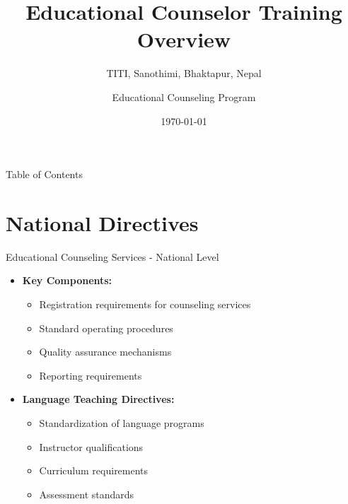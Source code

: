 \documentclass{beamer}
\title{Educational Counselor Training Overview}
\subtitle{TITI, Sanothimi, Bhaktapur, Nepal}
\author{Educational Counseling Program}
\date{\today}
\begin{document}
\begin{frame}
\titlepage
\end{frame}

\begin{frame}{Table of Contents}
\tableofcontents
\end{frame}

\section{National Directives}
\begin{frame}{Educational Counseling Services - National Level}
\begin{itemize}
    \item \textbf{Key Components:}
    \begin{itemize}
        \item Registration requirements for counseling services
        \item Standard operating procedures
        \item Quality assurance mechanisms
        \item Reporting requirements
    \end{itemize}
    \item \textbf{Language Teaching Directives:}
    \begin{itemize}
        \item Standardization of language programs
        \item Instructor qualifications
        \item Curriculum requirements
        \item Assessment standards
    \end{itemize}
\end{itemize}
\end{frame}
\end{document}
